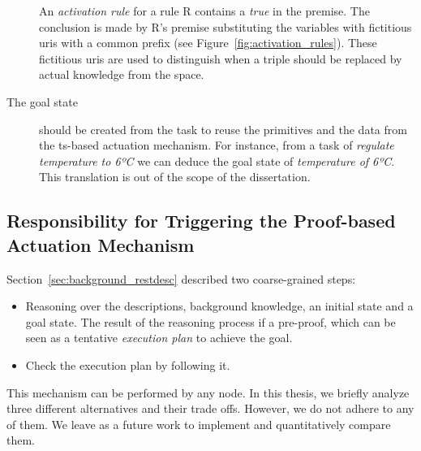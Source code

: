 \begin{description}

	An \emph{activation rule} for a rule R contains a \emph{true} in the premise.
	The conclusion is made by R's premise substituting the variables with fictitious \acsp{uri} with a common prefix (see Figure~\ref{fig:activation_rules}).
	These fictitious \acsp{uri} are used to distinguish when a triple should be replaced by actual knowledge from the space. %


  \item[The goal state] should be created from the task to reuse the primitives and the data from the \ac{ts}-based actuation mechanism.
	For instance, from a task of \emph{regulate temperature to 6ºC} we can deduce the goal state of \emph{temperature of 6ºC}.
	This translation is out of the scope of the dissertation.
\end{description}


\subsection{Responsibility for Triggering the Proof-based Actuation Mechanism}
\label{sec:responsible_proof}

Section~\ref{sec:background_restdesc} described two coarse-grained steps:
\begin{itemize}
  \item Reasoning over the descriptions, background knowledge, an initial state and a goal state.
        The result of the reasoning process if a pre-proof, which can be seen as a tentative \emph{execution plan} to achieve the goal.
  \item Check the execution plan by following it.
\end{itemize}


This mechanism can be performed by any node.
In this thesis, we briefly analyze three different alternatives and their trade offs.
However, we do not adhere to any of them.
We leave as a future work to implement and quantitatively compare them.

